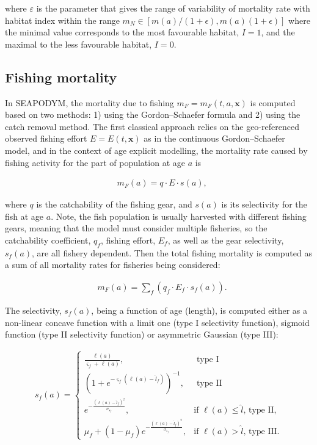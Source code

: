 \noindent where $\varepsilon$ is the parameter that gives the range of variability of mortality rate with habitat index within the range $m_N \in [m(a)/(1+\epsilon),m(a)(1+\epsilon)]$ where the minimal value corresponds to the most favourable habitat, $I=1$, and the maximal to the less favourable habitat, $I=0$. 


\subsection{Fishing mortality}\label{sec:FM}
In SEAPODYM, the mortality due to fishing $m_F=m_F(t,a,\mathbf{x})$ is computed based on two methods: 1) using  the Gordon--Schaefer formula and 2) using the catch removal method. The first classical approach relies on the geo-referenced observed fishing effort $E=E(t,\mathbf{x})$ as in the continuous Gordon--Schaefer model, and in the context of age explicit modelling, the mortality rate caused by fishing activity for the part of population at age $a$ is  

\begin{align}
&m_F(a)= q \cdot E \cdot s(a), 
\label{eq:Gordon--Schaefer}
\end{align}

\noindent where $q$ is the catchability of the fishing gear, and $s(a)$ is its selectivity for the fish at age $a$. Note, the fish population is usually harvested with different fishing gears, meaning that the model must consider multiple fisheries, so the catchability coefficient, $q_f$, fishing effort, $E_f$, as well as the gear selectivity, $s_f(a)$, are all fishery dependent. Then the total fishing mortality is computed as a sum of all mortality rates for fisheries being considered:

\begin{align}
&m_F(a)= \sum_f(q_f \cdot E_f \cdot s_f(a)). 
\label{eq:FM}
\end{align}

The selectivity, $s_f(a)$, being a function of age (length), is computed either as a non-linear concave function with a limit one (type I selectivity function), sigmoid function (type II selectivity function) or asymmetric Gaussian (type III):

\begin{eqnarray}
  \label{eq:fishery-specific-selectivity}
  s_{f}(a) = 
  \left\{\begin{array}{lll}
      \frac{\ell(a)}{\varsigma_f+\ell(a)},  & \textrm{  type I} \\
      \left(1+e^{-\varsigma_f (\ell(a)-\hat{l}_f)}\right)^{-1}, 
      & \textrm{  type II} \\
      e^{-\frac{(\ell(a)-\hat{l}_f)^2}{\sigma_{s_f}}}, 
      & \textrm{if $\ell(a)\leq\hat{l}$} \textrm{,  type II,}\\
      \mu_f+(1-\mu_f)e^{-\frac{(\ell(a)-\hat{l}_f)^2}{\sigma_{s_f}}}, 
      & \textrm{if $\ell(a)>\hat{l}$} \textrm{,  type III.} 
  \end{array}\right.
\end{eqnarray}	 



